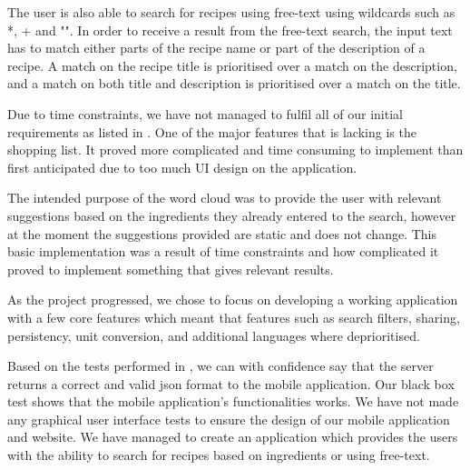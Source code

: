 The user is also able to search for recipes using free-text using wildcards such as *, + and "". In order to receive a result from the free-text search, the input text has to match either parts of the recipe name or part of the description of a recipe. A match on the recipe title is prioritised over a match on the description, and a match on both title and description is prioritised over a match on the title.

Due to time constraints, we have not managed to fulfil all of our initial requirements as listed in . One of the major features that is lacking is the shopping list. It proved more complicated and time consuming to implement than first anticipated due to too much UI design on the application.

The intended purpose of the word cloud was to provide the user with relevant suggestions based on the ingredients they already entered to the search, however at the moment the suggestions provided are static and does not change. This basic implementation was a result of time constraints and how complicated it proved to implement something that gives relevant results. 

As the project progressed, we chose to focus on developing a working application with a few core features which meant that features such as search filters, sharing, persistency, unit conversion, and additional languages where deprioritised. 

Based on the tests performed in , we can with confidence say that the server returns a correct and valid \ac{json} format to the mobile application. Our black box test shows that the mobile application's functionalities works. We have not made any graphical user interface tests to ensure the design of our mobile application and website. We have managed to create an application which provides the users with the ability to search for recipes based on ingredients or using free-text.